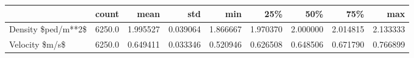 \begin{tabular}{lrrrrrrrr}
\toprule
{} &   count &      mean &       std &       min &       25\% &       50\% &       75\% &       max \\
\midrule
Density \$ped/m**2\$ &  6250.0 &  1.995527 &  0.039064 &  1.866667 &  1.970370 &  2.000000 &  2.014815 &  2.133333 \\
Velocity \$m/s\$     &  6250.0 &  0.649411 &  0.033346 &  0.520946 &  0.626508 &  0.648506 &  0.671790 &  0.766899 \\
\bottomrule
\end{tabular}
